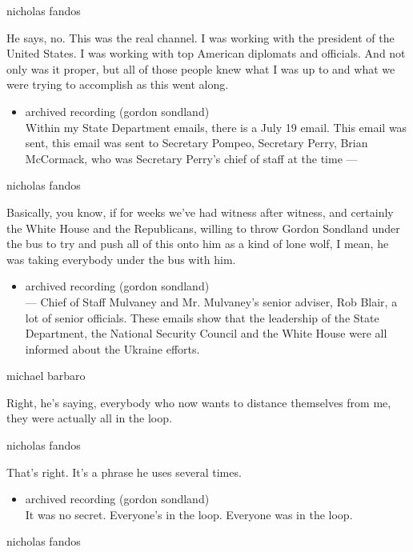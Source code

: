nicholas fandos

He says, no. This was the real channel. I was working with the president
of the United States. I was working with top American diplomats and
officials. And not only was it proper, but all of those people knew what
I was up to and what we were trying to accomplish as this went along.

\begin{itemize}
\tightlist
\item
  archived recording (gordon sondland)\\
  Within my State Department emails, there is a July 19 email. This
  email was sent, this email was sent to Secretary Pompeo, Secretary
  Perry, Brian McCormack, who was Secretary Perry's chief of staff at
  the time ---
\end{itemize}

nicholas fandos

Basically, you know, if for weeks we've had witness after witness, and
certainly the White House and the Republicans, willing to throw Gordon
Sondland under the bus to try and push all of this onto him as a kind of
lone wolf, I mean, he was taking everybody under the bus with him.

\begin{itemize}
\tightlist
\item
  archived recording (gordon sondland)\\
  --- Chief of Staff Mulvaney and Mr. Mulvaney's senior adviser, Rob
  Blair, a lot of senior officials. These emails show that the
  leadership of the State Department, the National Security Council and
  the White House were all informed about the Ukraine efforts.
\end{itemize}

michael barbaro

Right, he's saying, everybody who now wants to distance themselves from
me, they were actually all in the loop.

nicholas fandos

That's right. It's a phrase he uses several times.

\begin{itemize}
\tightlist
\item
  archived recording (gordon sondland)\\
  It was no secret. Everyone's in the loop. Everyone was in the loop.
\end{itemize}

nicholas fandos

